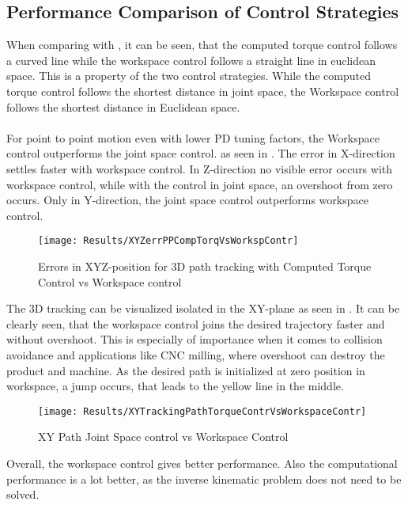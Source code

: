 \subsection{Performance Comparison of Control Strategies}
When comparing  with , it can be seen, that the computed torque control follows a curved line while the workspace control follows a straight line in euclidean space. This is a property of the two control strategies. While the computed torque control follows the shortest distance in joint space, the Workspace control follows the shortest distance in Euclidean space.\\
\\
For point to point motion even with lower PD tuning factors, the Workspace control outperforms the joint space control. as seen in . The error in X-direction settles faster with workspace control. In Z-direction no visible error occurs with workspace control, while with the control in joint space, an overshoot from zero occurs. Only in Y-direction, the joint space control outperforms workspace control.
\begin{figure}[H]
	\texttt{[image: Results/XYZerrPPCompTorqVsWorkspContr]}
	\caption{Errors in XYZ-position for 3D path tracking with Computed Torque Control vs Workspace control}
	\label{fig:XYZerrPPCompTorqVsWorkspContr}
\end{figure}

The 3D tracking can be visualized isolated in the XY-plane as seen in . It can be clearly seen, that the workspace control joins the desired trajectory faster and without overshoot. This is especially of importance when it comes to collision avoidance and applications like \ac{CNC} milling, where overshoot can destroy the product and machine. As the desired path is initialized at zero position in workspace, a jump occurs, that leads to the yellow line in the middle.

\begin{figure}[H]
	\texttt{[image: Results/XYTrackingPathTorqueContrVsWorkspaceContr]}
	\caption{XY Path Joint Space control vs Workspace Control}
	\label{fig:XYTrackingPathTorqueContrVsWorkspaceContr}
\end{figure}



Overall, the workspace control gives better performance. Also the computational performance is a lot better, as the inverse kinematic problem does not need to be solved.

